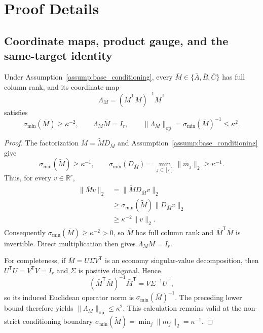\appendix

\section{Proof Details}\label{sec:proof-details}

\subsection{Coordinate maps, product gauge, and the same-target identity}
\label{app:step-001}

\begin{lemma}
\label{lem:step-001-base-coordinate}
Under Assumption~\ref{assump:base_conditioning}, every
$\bar M\in\{\bar A,\bar B,\bar C\}$ has full column rank, and its
coordinate map
\[
\Lambda_M=(\bar M^{\mathsf T}\bar M)^{-1}\bar M^{\mathsf T}
\]
satisfies
\[
\sigma_{\min}(\bar M)\geq\kappa^{-2},
\qquad
\Lambda_M\bar M=I_r,
\qquad
\|\Lambda_M\|_{\mathrm{op}}
=\sigma_{\min}(\bar M)^{-1}\leq\kappa^2.
\]
\end{lemma}

\begin{proof}
The factorization $\bar M=\widetilde M D_{\bar M}$ and
Assumption~\ref{assump:base_conditioning} give
\[
\sigma_{\min}(\widetilde M)\geq\kappa^{-1},
\qquad
\sigma_{\min}(D_{\bar M})
=\min_{j\in[r]}\|\bar m_j\|_2\geq\kappa^{-1}.
\]
Thus, for every $v\in\mathbb R^r$,
\[
\begin{aligned}
\|\bar Mv\|_2
&=\|\widetilde M D_{\bar M}v\|_2\\
&\geq\sigma_{\min}(\widetilde M)\|D_{\bar M}v\|_2\\
&\geq\kappa^{-2}\|v\|_2.
\end{aligned}
\]
Consequently $\sigma_{\min}(\bar M)\geq\kappa^{-2}>0$, so $\bar M$
has full column rank and $\bar M^{\mathsf T}\bar M$ is invertible.  Direct
multiplication then gives $\Lambda_M\bar M=I_r$.

For completeness, if
$\bar M=U\Sigma V^{\mathsf T}$ is an economy singular-value
decomposition, then $U^{\mathsf T}U=V^{\mathsf T}V=I_r$ and $\Sigma$ is
positive diagonal.  Hence
\[
(\bar M^{\mathsf T}\bar M)^{-1}\bar M^{\mathsf T}
=V\Sigma^{-1}U^{\mathsf T},
\]
so its induced Euclidean operator norm is
$\sigma_{\min}(\bar M)^{-1}$.  The preceding lower bound therefore yields
$\|\Lambda_M\|_{\mathrm{op}}\leq\kappa^2$.  This calculation remains
valid at the non-strict conditioning boundary
$\sigma_{\min}(\widetilde M)=\min_j\|\bar m_j\|_2=\kappa^{-1}$.
\end{proof}

